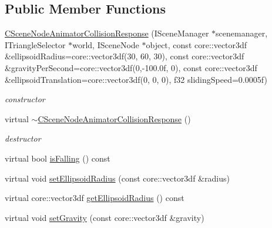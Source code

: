 \subsection*{Public Member Functions}
\begin{DoxyCompactItemize}
\item 
\hypertarget{classirr_1_1scene_1_1_c_scene_node_animator_collision_response_a446936ec73dc8168da51d94969998ced}{\hyperlink{classirr_1_1scene_1_1_c_scene_node_animator_collision_response_a446936ec73dc8168da51d94969998ced}{C\-Scene\-Node\-Animator\-Collision\-Response} (I\-Scene\-Manager $\ast$scenemanager, I\-Triangle\-Selector $\ast$world, I\-Scene\-Node $\ast$object, const core\-::vector3df \&ellipsoid\-Radius=core\-::vector3df(30, 60, 30), const core\-::vector3df \&gravity\-Per\-Second=core\-::vector3df(0,-\/100.\-0f, 0), const core\-::vector3df \&ellipsoid\-Translation=core\-::vector3df(0, 0, 0), f32 sliding\-Speed=0.\-0005f)}\label{classirr_1_1scene_1_1_c_scene_node_animator_collision_response_a446936ec73dc8168da51d94969998ced}

\begin{DoxyCompactList}\small\item\em constructor \end{DoxyCompactList}\item 
\hypertarget{classirr_1_1scene_1_1_c_scene_node_animator_collision_response_ab406360f5ecec25e336580a73f40a683}{virtual \hyperlink{classirr_1_1scene_1_1_c_scene_node_animator_collision_response_ab406360f5ecec25e336580a73f40a683}{$\sim$\-C\-Scene\-Node\-Animator\-Collision\-Response} ()}\label{classirr_1_1scene_1_1_c_scene_node_animator_collision_response_ab406360f5ecec25e336580a73f40a683}

\begin{DoxyCompactList}\small\item\em destructor \end{DoxyCompactList}\item 
virtual bool \hyperlink{classirr_1_1scene_1_1_c_scene_node_animator_collision_response_a25b06cd869b7534b1232da682ffdcc4f}{is\-Falling} () const 
\item 
virtual void \hyperlink{classirr_1_1scene_1_1_c_scene_node_animator_collision_response_a0b5e6895dbb1d030b1647dcde368e475}{set\-Ellipsoid\-Radius} (const core\-::vector3df \&radius)
\item 
virtual core\-::vector3df \hyperlink{classirr_1_1scene_1_1_c_scene_node_animator_collision_response_a910bfc2a547e34855fa9e4ecfbc850db}{get\-Ellipsoid\-Radius} () const 
\item 
\hypertarget{classirr_1_1scene_1_1_c_scene_node_animator_collision_response_ac52642be6e4dd5f7988fffa244f49f1e}{virtual void \hyperlink{classirr_1_1scene_1_1_c_scene_node_animator_collision_response_ac52642be6e4dd5f7988fffa244f49f1e}{set\-Gravity} (const core\-::vector3df \&gravity)}\label{classirr_1_1scene_1_1_c_scene_node_animator_collision_response_ac52642be6e4dd5f7988fffa244f49f1e}


\end{DoxyCompactItemize}

